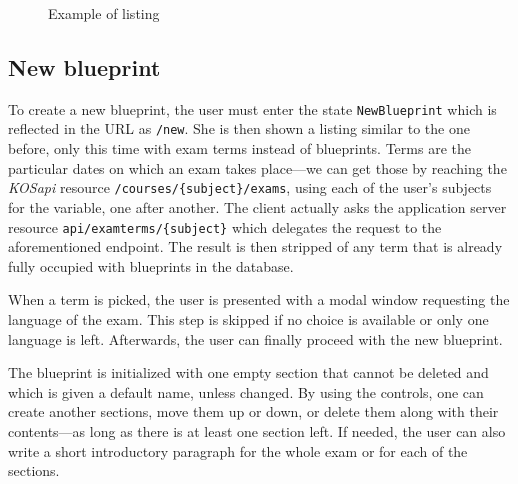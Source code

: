 \documentclass[thesis=M,english,hidelinks]{FITthesis}[2012/10/20]
\newcommand{\code}{\texttt}
\begin{document}
\begin{figure}
  \setlength\fboxsep{0pt}
  \setlength\fboxrule{0.2pt}
  \caption{Example of listing}
  \label{fig:listing}
\end{figure}

    \subsection{New blueprint}

To create a new blueprint, the user must enter the state \code{NewBlueprint} which is reflected in the URL as \code{/new}. She is then shown a listing similar to the one before, only this time with exam terms instead of blueprints. Terms are the particular dates on which an exam takes place---we can get those by reaching the \textit{KOSapi} resource \code{/courses/\{subject\}/exams}, using each of the user's subjects for the variable, one after another. The client actually asks the application server resource \code{api/examterms/\{subject\}} which delegates the request to the aforementioned endpoint. The result is then stripped of any term that is already fully occupied with blueprints in the database.

When a term is picked, the user is presented with a modal window requesting the language of the exam. This step is skipped if no choice is available or only one language is left. Afterwards, the user can finally proceed with the new blueprint.

The blueprint is initialized with one empty section that cannot be deleted and which is given a default name, unless changed. By using the controls, one can create another sections, move them up or down, or delete them along with their contents---as long as there is at least one section left. If needed, the user can also write a short introductory paragraph for the whole exam or for each of the sections.
\end{document}
